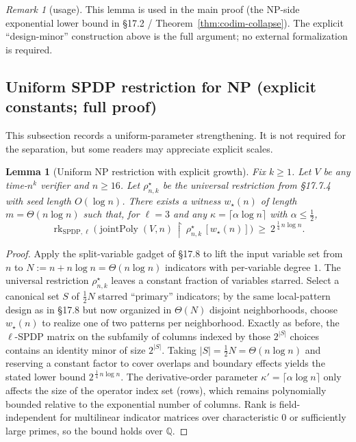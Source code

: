 \documentclass[12pt]{article}
\newtheorem{lemma}[theorem]{Lemma}
\theoremstyle{definition}
\theoremstyle{definition}
\theoremstyle{remark}
\newtheorem{remark}{Remark}
\theoremstyle{remark}
\begin{document}
\begin{remark}[usage]
This lemma is used in the main proof (the NP-side exponential lower bound in \S17.2 / Theorem~\ref{thm:codim-collapse}). The explicit ``design-minor'' construction above is the full argument; no external formalization is required.
\end{remark}

\subsection{Uniform SPDP restriction for NP (explicit constants; full proof)}

This subsection records a uniform-parameter strengthening. It is not required for the separation, but some readers may appreciate explicit scales.

\begin{lemma}[Uniform NP restriction with explicit growth]\label{lem:uniform-np-restriction}
Fix $k\ge 1$. Let $V$ be any time-$n^k$ verifier and $n\ge 16$. Let $\rho^\star_{n,k}$ be the universal restriction from \S17.7.4 with seed length $O(\log n)$. There exists a witness $w_\star(n)$ of length $m=\Theta(n\log n)$ such that, for $\ell=3$ and any $\kappa=\lceil\alpha\log n\rceil$ with $\alpha\le\frac{1}{2}$,
\[
\operatorname{rk}_{\mathrm{SPDP},\ell}\!\big(\operatorname{jointPoly}(V,n)\,\upharpoonright\,\rho^\star_{n,k}\,[w_\star(n)]\big)\ \ge\ 2^{\,\frac{1}{4}\,n\log n}.
\]
\end{lemma}

\begin{proof}
Apply the split-variable gadget of \S17.8 to lift the input variable set from $n$ to $N:=n+n\log n=\Theta(n\log n)$ indicators with per-variable degree $1$. The universal restriction $\rho^\star_{n,k}$ leaves a constant fraction of variables starred. Select a canonical set $S$ of $\frac{1}{2}N$ starred ``primary'' indicators; by the same local-pattern design as in \S17.8 but now organized in $\Theta(N)$ disjoint neighborhoods, choose $w_\star(n)$ to realize one of two patterns per neighborhood. Exactly as before, the $\ell$-SPDP matrix on the subfamily of columns indexed by those $2^{|S|}$ choices contains an identity minor of size $2^{|S|}$. Taking $|S|=\frac{1}{2}N=\Theta(n\log n)$ and reserving a constant factor to cover overlaps and boundary effects yields the stated lower bound $2^{\,\frac{1}{4}\,n\log n}$. The derivative-order parameter $\kappa'=\lceil\alpha\log n\rceil$ only affects the size of the operator index set (rows), which remains polynomially bounded relative to the exponential number of columns. Rank is field-independent for multilinear indicator matrices over characteristic $0$ or sufficiently large primes, so the bound holds over $\mathbb{Q}$.
\end{proof}
\end{document}
